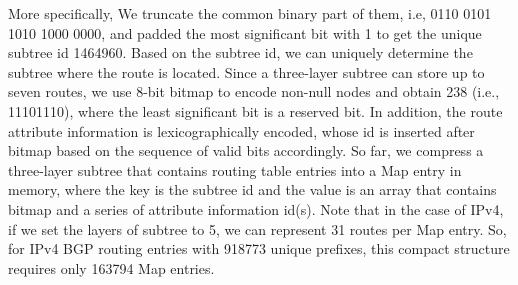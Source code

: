 More specifically, We truncate the common binary part of them, i.e, 0110 0101 1010 1000 0000, and padded the most significant bit with 1 to get the unique subtree id 1464960. Based on the subtree id, we can uniquely determine the subtree where the route is located. Since a three-layer subtree can store up to seven routes, we use 8-bit bitmap to encode non-null nodes and obtain 238 (i.e., 11101110), where the least significant bit is a reserved bit. In addition, the route attribute information is lexicographically encoded, whose id is inserted after bitmap based on the sequence of valid bits accordingly. So far, we compress a three-layer subtree that contains routing table entries into a Map entry in memory, where the key is the subtree id and the value is an array that contains bitmap and a series of attribute information id(s). Note that in the case of IPv4, if we set the layers of subtree to 5, we can represent 31 routes per Map entry. So, for IPv4 BGP routing entries with 918773 unique prefixes, this compact structure requires only 163794 Map entries.
\fi